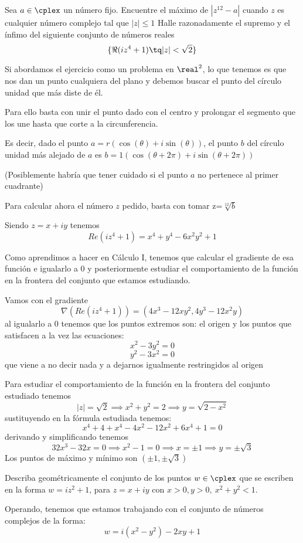 \begin{problem}[19]
\ppart Sea $a \in \cplex$ un número fijo. Encuentre el máximo de $|z^{12}-a|$ cuando $z$ es cualquier número complejo tal que $|z|\leq 1$
\ppart Halle razonadamente el supremo y el ínfimo del siguiente conjunto de números reales
\[\{\Re(iz^4+1) \tq |z|<\sqrt{2}\}\]

\solution
{}

\spart
Si abordamos el ejercicio como un problema en $\real^2$, lo que tenemos es que nos dan un punto cualquiera del plano y debemos buscar el punto del círculo unidad que más diste de él.

Para ello basta con unir el punto dado con el centro y prolongar el segmento que los une hasta que corte a la circunferencia.

Es decir, dado el punto $a=r\left(\cos(\theta)+i\sin(\theta)\right)$, el punto $b$ del círculo unidad más alejado de $a$ es $b=1\left(\cos(\theta +2π)+i\sin(\theta +2π)\right)$

(Posiblemente habría que tener cuidado si el punto $a$ no pertenece al primer cuadrante)

Para calcular ahora el número $z$ pedido, basta con tomar z=$\sqrt[12]{b}$

\spart
Siendo $z=x+iy$ tenemos
\[Re(iz^4+1)=x^4+y^4-6x^2y^2+1\]

Como aprendimos a hacer en Cálculo I, tenemos que calcular el gradiente de esa función e igualarlo a 0 y posteriormente estudiar el comportamiento de la función en la frontera del conjunto que estamos estudiando.

Vamos con el gradiente
\[\nabla \left(Re(iz^4+1)\right) = \left(4x^3-12xy^2, 4y^3-12x^2y\right)\]
al igualarlo a 0 tenemos que los puntos extremos son: el origen y los puntos que satisfacen a la vez las ecuaciones:
\[x^2-3y^2=0\]
\[y^2-3x^2=0\]
que viene a no decir nada y a dejarnos igualmente restringidos al origen

Para estudiar el comportamiento de la función en la frontera del conjunto estudiado tenemos
\[|z| = \sqrt{2} \implies x^2+y^2 =2 \implies y=\sqrt{2-x^2} \]
sustituyendo en la fórmula estudiada tenemos:
\[x^4+4+x^4-4x^2-12x^2+6x^4 +1 =0\]
derivando y simplificando tenemos
\[32x^3-32x=0 \implies x^2-1=0 \implies x=\pm 1 \implies y = \pm \sqrt{3}\]
Los puntos de máximo y mínimo son $(\pm 1, \pm \sqrt{3})$

\end{problem}

\begin{problem}[20]
Describa geométricamente el conjunto de los puntos $w \in \cplex$ que se escriben en la forma $w=iz^2+1$, para $z=x+iy$ con $x>0, y>0, \ x^2+y^2<1$.

\solution

Operando, tenemos que estamos trabajando con el conjunto de números complejos de la forma:
\[w=i(x^2-y^2)-2xy+1\]


\end{problem}

